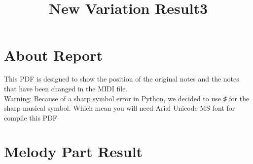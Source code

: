 \documentclass{article}
\title{New Variation Result3}
\begin{document}
\maketitle
\section*{About Report}
This PDF is designed to show the position of the original notes and the notes that have been changed in the MIDI file. \\
Warning: Because of a sharp symbol error in Python, we decided to use ♯ for the sharp musical symbol. Which mean you will need Arial Unicode MS font for compile this PDF
\section*{Melody Part Result}
\end{document}
